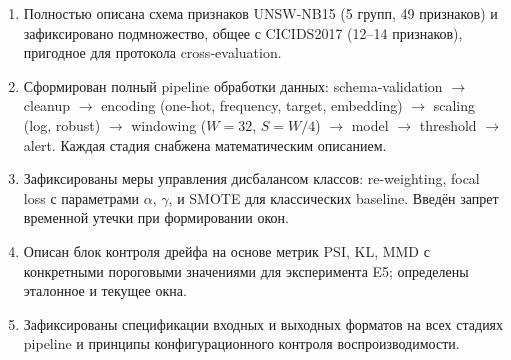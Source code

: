 \begin{enumerate}
    \item Полностью описана схема признаков UNSW-NB15 (5 групп, 49
    признаков) и зафиксировано подмножество, общее с CICIDS2017
    (12--14 признаков), пригодное для протокола cross-evaluation.
    \item Сформирован полный pipeline обработки данных:
    schema-validation $\to$ cleanup $\to$ encoding (one-hot, frequency,
    target, embedding) $\to$ scaling (log, robust) $\to$ windowing
    (\(W=32\), \(S=W/4\)) $\to$ model $\to$ threshold $\to$ alert.
    Каждая стадия снабжена математическим описанием.
    \item Зафиксированы меры управления дисбалансом классов: re-weighting,
    focal loss с параметрами \(\alpha\), \(\gamma\), и SMOTE для классических
    baseline. Введён запрет временной утечки при формировании окон.
    \item Описан блок контроля дрейфа на основе метрик PSI, KL, MMD с
    конкретными пороговыми значениями для эксперимента E5; определены
    эталонное и текущее окна.
    \item Зафиксированы спецификации входных и выходных форматов на всех
    стадиях pipeline и принципы конфигурационного контроля воспроизводимости.
\end{enumerate}
